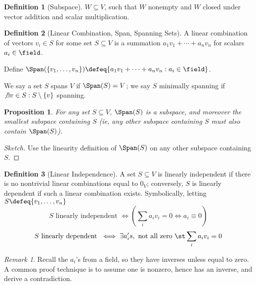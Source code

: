 \documentclass[12pt, oneside]{article}
\theoremstyle{definition}
\newtheorem{defn}{Definition}
\theoremstyle{plain}
\newtheorem{prop}{Proposition}
\theoremstyle{remark}
\newtheorem{remark}{Remark}
\begin{document}
\begin{defn}[Subspace]
  $W \subseteq V$, such that $W$ nonempty and $W$ closed under vector addition and scalar multiplication.
\end{defn}


\begin{defn}[Linear Combination, Span, Spanning Sets]
  A linear combination of vectors $v_i \in S$ for some set $S \subseteq V$ is a summation $a_1 v_1 + \cdots + a_n v_n$ for scalars $a_i \in \field$.

  Define $\Span(\{v_1, \dots, v_n\}) \defeq \{a_1 v_1 + \cdots + a_n v_n : a_i \in \field\}$.

  We say a set $S$ spans $V$ if $\Span(S) = V$; we say $S$ minimally spanning if $\not\exists v \in S : S\setminus \{v\}$ spanning. 
\end{defn}

\begin{prop}
  For any set $S \subseteq V$, $\Span(S)$ is a subspace, and moreover the smallest subspace containing $S$ (ie, any other subspace containing $S$ must also contain $\Span(S)$).
\end{prop}

\begin{proof}[Sketch]
  Use the linearity definition of $\Span(S)$ on any other subspace containing $S$.
\end{proof}

\begin{defn}[Linear Independence]
  A set $S \subseteq V$ is linearly independent if there is no nontrivial linear combinations equal to $0_V$; conversely, $S$ is linearly dependent if such a linear combination exists. Symbolically, letting $S \defeq \{v_1, \dots, v_n\}$ \[
  S\text{ linearly independent } \iff (\sum_i a_i v_i = 0 \iff a_i \equiv 0)\]\[
  S \text{ linearly dependent } \iff \exists a_i's, \text{ not all zero }\st \sum_i a_i v_i = 0
  \]
\end{defn}

\begin{remark}
Recall the $a_i$'s from a field, so they have inverses unless equal to zero. A common proof technique is to assume one is nonzero, hence has an inverse, and derive a contradiction.  
\end{remark}
\end{document}
